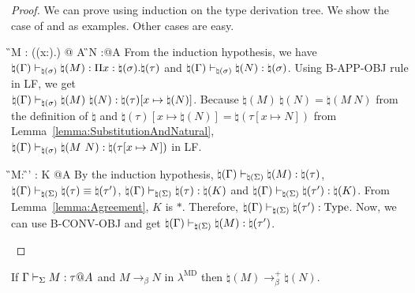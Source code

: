 \begin{proof}
    We can prove using induction on the type derivation tree.
    We show the case of \TApp{} and \TConv{} as examples.
    Other cases are easy.
    \begin{rneqncase}{\TApp{}}{
            \G \V M : (\Pi(x:\sigma).\tau) @ A  \G \V N :\sigma @A
        }
        From the induction hypothesis, we have \({ \natural(\Gamma)
        \vdash_{\natural(\sigma)} \natural(M) : \Pi
        x:\natural(\sigma).\natural(\tau) }\) and \({ \natural(\Gamma)
        \vdash_{\natural(\sigma)} \natural(N) : \natural(\sigma) }\).  Using
        \textsc{B-APP-OBJ} rule in LF, we get \\ \({ \natural(\Gamma)
        \vdash_{\natural(\sigma)} \natural(M)\ \natural(N) : \natural(\tau)[x
        \mapsto \natural(N)] }\).  Because \({ \natural(M)\ \natural(N) =
        \natural(M\ N) }\) from the definition of $\natural$ and \({ \natural(\tau)[x \mapsto \natural(N)] = \natural(\tau[x \mapsto N]) }\) from Lemma~\ref{lemma:SubstitutionAndNatural}, \\
        ${ \natural(\Gamma) \vdash_{\natural(\sigma)} \natural(M\ N) :
        \natural(\tau[x \mapsto N]) }$ in LF.
    \end{rneqncase}
    \begin{rneqncase}{\TConv{}}{
            \G\V M:\tau@A {} \G\V \tau \E \tau' : K @A
        }
        By the induction hypothesis, \( \natural(\Gamma) \vdash_{\natural(\Sigma)}
        \natural(M):\natural(\tau) \), \( \natural(\Gamma)
        \vdash_{\natural(\Sigma)} \natural(\tau) \equiv \natural(\tau') \), \(
        \natural(\Gamma) \vdash_{\natural(\Sigma)} \natural(\tau) : \natural(K) \)
        and \( \natural(\Gamma) \vdash_{\natural(\Sigma)} \natural(\tau') :
        \natural(K) \). From Lemma~\ref{lemma:Agreement}, \( K \) is \( * \).
        Therefore, \( \natural(\Gamma) \vdash_{\natural(\Sigma)} \natural(\tau') :
        \text{Type} \). Now, we can use \textsc{B-CONV-OBJ} and get \(
        \natural(\Gamma) \vdash_{\natural(\Sigma)} \natural(M) : \natural(\tau')
        \).
    \end{rneqncase}
\end{proof}

\begin{lemma}
    \label{lemma:PreservationOfBetaReductionInNatural}
    If $\G \V M:\tau@A$ and $M \longrightarrow_\beta N$ in $\lambda^{\text{MD}}$
    then $\natural(M) \longrightarrow_\beta^+ \natural(N)$.
\end{lemma}


